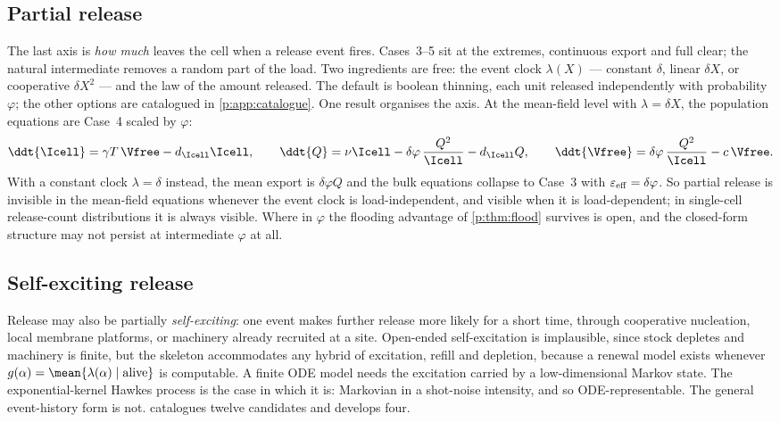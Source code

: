 \subsection{Partial release}
\label{p:sec:partial}

The last axis is \emph{how much} leaves the cell when a release event
fires. Cases~3--5 sit at the extremes, continuous export and full clear; the
natural intermediate removes a random part of the load. Two ingredients are
free: the event clock $\lambda(X)$ --- constant $\delta$, linear $\delta X$,
or cooperative $\delta X^2$ --- and the law of the amount released. The
default is boolean thinning, each unit released independently with
probability $\varphi$; the other options are catalogued in
\cref{p:app:catalogue}. One result organises the axis. At the mean-field level with $\lambda=\delta
X$, the population equations are Case~4 scaled by $\varphi$:
\begin{equation}
\ddt{\Icell}=\gamma T\,\Vfree-d_{\Icell}\Icell,
\qquad
\ddt{Q}=\nu\Icell-\delta\varphi\,\frac{Q^2}{\Icell}-d_{\Icell}Q,
\qquad
\ddt{\Vfree}=\delta\varphi\,\frac{Q^2}{\Icell}-c\,\Vfree.
\label{p:eq:partial}
\end{equation}
With a constant clock $\lambda=\delta$ instead, the mean export is
$\delta\varphi Q$ and the bulk equations collapse to Case~3 with
$\varepsilon_{\rm eff}=\delta\varphi$. So partial release is invisible in
the mean-field equations whenever the event clock is load-independent, and
visible when it is load-dependent; in single-cell release-count
distributions it is always visible. Where in $\varphi$ the flooding advantage
of \cref{p:thm:flood} survives is open, and the closed-form structure may not
persist at intermediate $\varphi$ at all.

\subsection{Self-exciting release}
\label{p:sec:selfexcite}

Release may also be partially \emph{self-exciting}: one event makes further
release more likely for a short time, through cooperative nucleation, local
membrane platforms, or machinery already recruited at a site. Open-ended
self-excitation is implausible, since stock depletes and machinery is
finite, but the skeleton accommodates any hybrid of excitation, refill and
depletion, because a renewal model exists whenever
$g(\alpha)=\mean{\lambda(\alpha)\mid\text{alive}}$ is computable. A finite
ODE model needs the excitation carried by a low-dimensional Markov state.
The exponential-kernel Hawkes process \cite{hawkes1971spectra} is the case
in which it is: Markovian in a shot-noise intensity, and so
ODE-representable. The general event-history form is not.
 catalogues twelve candidates and develops four.

